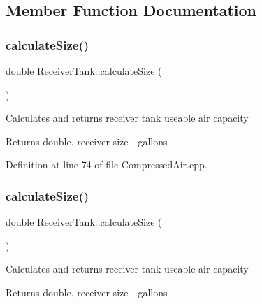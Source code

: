 \subsection{Member Function Documentation}
\mbox{\label{class_receiver_tank_a5841344b63c444e4ceb9c3b7daeaf613}} 
\subsubsection{\texorpdfstring{calculate\+Size()}{calculateSize()}\hspace{0.1cm}{\footnotesize\ttfamily [1/3]}}
{\footnotesize\ttfamily double Receiver\+Tank\+::calculate\+Size (\begin{DoxyParamCaption}{ }\end{DoxyParamCaption})}

Calculates and returns receiver tank useable air capacity \begin{DoxyReturn}{Returns}
double, receiver size -\/ gallons 
\end{DoxyReturn}


Definition at line 74 of file Compressed\+Air.\+cpp.

\mbox{\label{class_receiver_tank_a5841344b63c444e4ceb9c3b7daeaf613}} 
\subsubsection{\texorpdfstring{calculate\+Size()}{calculateSize()}\hspace{0.1cm}{\footnotesize\ttfamily [2/3]}}
{\footnotesize\ttfamily double Receiver\+Tank\+::calculate\+Size (\begin{DoxyParamCaption}{ }\end{DoxyParamCaption})}

Calculates and returns receiver tank useable air capacity \begin{DoxyReturn}{Returns}
double, receiver size -\/ gallons 
\end{DoxyReturn}
\mbox{\label{class_receiver_tank_a5841344b63c444e4ceb9c3b7daeaf613}} 
